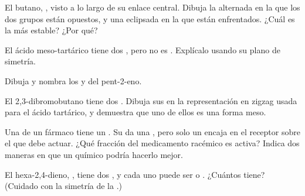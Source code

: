 \begin{exercise}[$\star\star$]\label{exo:g12:stereochemistry:9}
El butano, , visto a lo largo de su enlace central.
Dibuja la  alternada en la que los dos grupos  están
opuestos, y una eclipsada en la que están enfrentados. ¿Cuál es la más
estable? ¿Por qué?
\end{exercise}

\begin{exercise}[$\star\star$]\label{exo:g12:stereochemistry:10}
El ácido meso-tartárico tiene dos , pero no es
. Explícalo usando su plano de simetría.
\end{exercise}

\begin{exercise}[$\star\star$]\label{exo:g12:stereochemistry:11}
Dibuja y nombra los  y  del pent-2-eno.
\end{exercise}

\begin{exercise}[$\star\star\star$]\label{exo:g12:stereochemistry:12}
El 2,3-dibromobutano  tiene dos . Dibuja sus  en la representación en zigzag
usada para el ácido tartárico, y demuestra que uno de ellos es una forma
meso.
\end{exercise}

\begin{exercise}[$\star\star\star$]\label{exo:g12:stereochemistry:13}
Una  de un fármaco tiene un . Su  da
una , pero solo un  encaja en el receptor
 sobre el que debe actuar. ¿Qué fracción del medicamento racémico
es activa? Indica dos maneras en que un químico podría hacerlo mejor.
\end{exercise}

\begin{exercise}[$\star\star\star$]\label{exo:g12:stereochemistry:14}
El hexa-2,4-dieno, , tiene dos , y
cada uno puede ser  o . ¿Cuántos  tiene? (Cuidado con
la simetría de la .)
\end{exercise}

